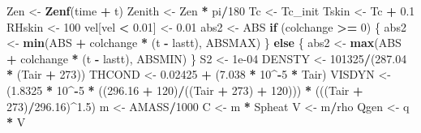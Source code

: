 \documentclass[]{article}
\newenvironment{Shaded}{\begin{snugshade}}{\end{snugshade}}
\newcommand{\KeywordTok}[1]{\textcolor[rgb]{0.13,0.29,0.53}{\textbf{#1}}}
\newcommand{\DecValTok}[1]{\textcolor[rgb]{0.00,0.00,0.81}{#1}}
\newcommand{\FloatTok}[1]{\textcolor[rgb]{0.00,0.00,0.81}{#1}}
\newcommand{\StringTok}[1]{\textcolor[rgb]{0.31,0.60,0.02}{#1}}
\newcommand{\ControlFlowTok}[1]{\textcolor[rgb]{0.13,0.29,0.53}{\textbf{#1}}}
\newcommand{\OperatorTok}[1]{\textcolor[rgb]{0.81,0.36,0.00}{\textbf{#1}}}
\newcommand{\NormalTok}[1]{#1}
\begin{document}
\begin{Shaded}
\begin{Highlighting}[]
\NormalTok{    Zen <-}\StringTok{ }\KeywordTok{Zenf}\NormalTok{(time }\OperatorTok{+}\StringTok{ }\NormalTok{t)}
\NormalTok{    Zenith <-}\StringTok{ }\NormalTok{Zen }\OperatorTok{*}\StringTok{ }\NormalTok{pi}\OperatorTok{/}\DecValTok{180}
\NormalTok{    Tc <-}\StringTok{ }\NormalTok{Tc_init}
\NormalTok{    Tskin <-}\StringTok{ }\NormalTok{Tc }\OperatorTok{+}\StringTok{ }\FloatTok{0.1}
\NormalTok{    RHskin <-}\StringTok{ }\DecValTok{100}
\NormalTok{    vel[vel }\OperatorTok{<}\StringTok{ }\FloatTok{0.01}\NormalTok{] <-}\StringTok{ }\FloatTok{0.01}
\NormalTok{    abs2 <-}\StringTok{ }\NormalTok{ABS}
    \ControlFlowTok{if}\NormalTok{ (colchange }\OperatorTok{>=}\StringTok{ }\DecValTok{0}\NormalTok{) \{}
\NormalTok{        abs2 <-}\StringTok{ }\KeywordTok{min}\NormalTok{(ABS }\OperatorTok{+}\StringTok{ }\NormalTok{colchange }\OperatorTok{*}\StringTok{ }\NormalTok{(t }\OperatorTok{-}\StringTok{ }\NormalTok{lastt), ABSMAX)}
\NormalTok{    \}}
    \ControlFlowTok{else}\NormalTok{ \{}
\NormalTok{        abs2 <-}\StringTok{ }\KeywordTok{max}\NormalTok{(ABS }\OperatorTok{+}\StringTok{ }\NormalTok{colchange }\OperatorTok{*}\StringTok{ }\NormalTok{(t }\OperatorTok{-}\StringTok{ }\NormalTok{lastt), ABSMIN)}
\NormalTok{    \}}
\NormalTok{    S2 <-}\StringTok{ }\FloatTok{1e-04}
\NormalTok{    DENSTY <-}\StringTok{ }\DecValTok{101325}\OperatorTok{/}\NormalTok{(}\FloatTok{287.04} \OperatorTok{*}\StringTok{ }\NormalTok{(Tair }\OperatorTok{+}\StringTok{ }\DecValTok{273}\NormalTok{))}
\NormalTok{    THCOND <-}\StringTok{ }\FloatTok{0.02425} \OperatorTok{+}\StringTok{ }\NormalTok{(}\FloatTok{7.038} \OperatorTok{*}\StringTok{ }\DecValTok{10}\OperatorTok{^-}\DecValTok{5} \OperatorTok{*}\StringTok{ }\NormalTok{Tair)}
\NormalTok{    VISDYN <-}\StringTok{ }\NormalTok{(}\FloatTok{1.8325} \OperatorTok{*}\StringTok{ }\DecValTok{10}\OperatorTok{^-}\DecValTok{5} \OperatorTok{*}\StringTok{ }\NormalTok{((}\FloatTok{296.16} \OperatorTok{+}\StringTok{ }\DecValTok{120}\NormalTok{)}\OperatorTok{/}\NormalTok{((Tair }\OperatorTok{+}\StringTok{ }\DecValTok{273}\NormalTok{) }\OperatorTok{+}\StringTok{ }
\StringTok{        }\DecValTok{120}\NormalTok{))) }\OperatorTok{*}\StringTok{ }\NormalTok{(((Tair }\OperatorTok{+}\StringTok{ }\DecValTok{273}\NormalTok{)}\OperatorTok{/}\FloatTok{296.16}\NormalTok{)}\OperatorTok{^}\FloatTok{1.5}\NormalTok{)}
\NormalTok{    m <-}\StringTok{ }\NormalTok{AMASS}\OperatorTok{/}\DecValTok{1000}
\NormalTok{    C <-}\StringTok{ }\NormalTok{m }\OperatorTok{*}\StringTok{ }\NormalTok{Spheat}
\NormalTok{    V <-}\StringTok{ }\NormalTok{m}\OperatorTok{/}\NormalTok{rho}
\NormalTok{    Qgen <-}\StringTok{ }\NormalTok{q }\OperatorTok{*}\StringTok{ }\NormalTok{V}

\end{Highlighting}
\end{Shaded}
\end{document}
